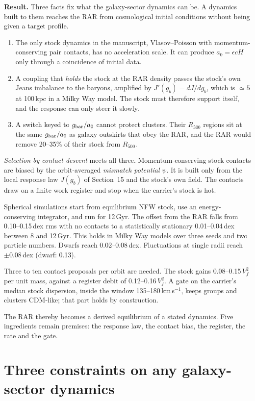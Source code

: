 \textbf{Result.} Three facts fix what the galaxy-sector dynamics can be. A dynamics built to them reaches the RAR from cosmological initial conditions without being given a target profile.
\begin{enumerate}
\item The only stock dynamics in the manuscript, Vlasov--Poisson with momentum-conserving pair contacts, has no acceleration scale. It can produce $a_0=\epsilon cH$ only through a coincidence of initial data.
\item A coupling that \emph{holds} the stock at the RAR density passes the stock's own Jeans imbalance to the baryons, amplified by $J'(g_b)=dJ/dg_b$, which is $\simeq5$ at 100\,kpc in a Milky Way model. The stock must therefore support itself, and the response can only steer it slowly.
\item A switch keyed to $g_{\rm bar}/a_0$ cannot protect clusters. Their $R_{500}$ regions sit at the same $g_{\rm bar}/a_0$ as galaxy outskirts that obey the RAR, and the RAR would remove 20--35\% of their stock from $R_{500}$.
\end{enumerate}
\emph{Selection by contact descent} meets all three. Momentum-conserving stock contacts are biased by the orbit-averaged \emph{mismatch potential} $\psi$. It is built only from the local response law $J(g_b)$ of Section~15 and the stock's own field. The contacts draw on a finite work register and stop when the carrier's stock is hot.

Spherical simulations start from equilibrium NFW stock, use an energy-conserving integrator, and run for 12\,Gyr. The offset from the RAR falls from 0.10--0.15\,dex rms with no contacts to a statistically stationary 0.01--0.04\,dex between 8 and 12\,Gyr. This holds in Milky Way models over three seeds and two particle numbers. Dwarfs reach 0.02--0.08\,dex. Fluctuations at single radii reach $\pm0.08$\,dex (dwarf: 0.13).

Three to ten contact proposals per orbit are needed. The stock gains 0.08--0.15\,$V_f^2$ per unit mass, against a register debit of 0.12--0.16\,$V_f^2$. A gate on the carrier's median stock dispersion, inside the window 135--180\,km\,s$^{-1}$, keeps groups and clusters CDM-like; that part holds by construction.

The RAR thereby becomes a derived equilibrium of a stated dynamics. Five ingredients remain premises: the response law, the contact bias, the register, the rate and the gate.

\section{Three constraints on any galaxy-sector dynamics}

